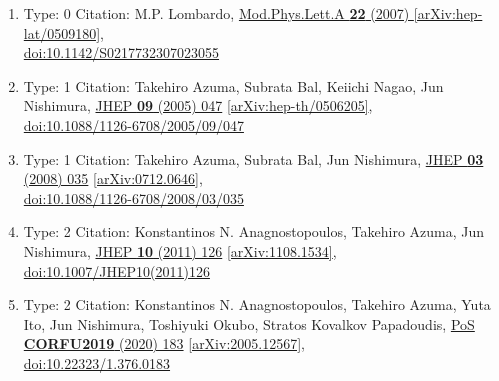 \documentclass[a4paper,10pt]{article}
\begin{document}
\begin{enumerate}
\begin{enumerate}
  \item Type: 0 Citation: M.P. Lombardo, \href{https://www.doi.org/10.1142/S0217732307023055}{Mod.Phys.Lett.A {\bf 22} (2007) }  \href{https://arxiv.org/abs/hep-lat/0509180}{[arXiv:hep-lat/0509180]},\\\href{https://www.doi.org/10.1142/S0217732307023055}{doi:10.1142/S0217732307023055}
  \item Type: 1 Citation: Takehiro Azuma, Subrata Bal, Keiichi Nagao, Jun Nishimura, \href{https://www.doi.org/10.1088/1126-6708/2005/09/047}{JHEP {\bf 09} (2005) 047}  \href{https://arxiv.org/abs/hep-th/0506205}{[arXiv:hep-th/0506205]},\\\href{https://www.doi.org/10.1088/1126-6708/2005/09/047}{doi:10.1088/1126-6708/2005/09/047}
  \item Type: 1 Citation: Takehiro Azuma, Subrata Bal, Jun Nishimura, \href{https://www.doi.org/10.1088/1126-6708/2008/03/035}{JHEP {\bf 03} (2008) 035}  \href{https://arxiv.org/abs/0712.0646}{[arXiv:0712.0646]},\\\href{https://www.doi.org/10.1088/1126-6708/2008/03/035}{doi:10.1088/1126-6708/2008/03/035}
  \item Type: 2 Citation: Konstantinos N. Anagnostopoulos, Takehiro Azuma, Jun Nishimura, \href{https://www.doi.org/10.1007/JHEP10(2011)126}{JHEP {\bf 10} (2011) 126}  \href{https://arxiv.org/abs/1108.1534}{[arXiv:1108.1534]},\\\href{https://www.doi.org/10.1007/JHEP10(2011)126}{doi:10.1007/JHEP10(2011)126}
  \item Type: 2 Citation: Konstantinos N. Anagnostopoulos, Takehiro Azuma, Yuta Ito, Jun Nishimura, Toshiyuki Okubo, Stratos Kovalkov Papadoudis, \href{https://www.doi.org/10.22323/1.376.0183}{PoS {\bf CORFU2019} (2020) 183}  \href{https://arxiv.org/abs/2005.12567}{[arXiv:2005.12567]},\\\href{https://www.doi.org/10.22323/1.376.0183}{doi:10.22323/1.376.0183}

\end{enumerate}
\end{enumerate}
\end{document}
